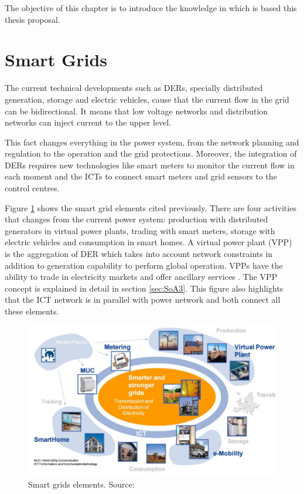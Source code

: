 \documentclass[a4paper,11pt,twoside,openright]{report}
\begin{document}
The objective of this chapter is to introduce the knowledge in which is based this thesis proposal.

\section{Smart Grids}
\label{sec:SG}
The current technical developments such as DERs, specially distributed generation, storage and electric vehicles, cause that the current flow in the grid can be bidirectional. It means that low voltage networks and distribution networks can inject current to the upper level.

This fact changes everything in the power system, from the network planning and regulation to the operation and the grid protections. Moreover, the integration of DERs requires new technologies like smart meters to monitor the current flow in each moment and the ICTs to connect smart meters and grid sensors to the control centres.

Figure \ref{fig:smart_grid_elements} shows the smart grid elements cited previously. There are four activities that changes from the current power system: production with distributed generators in virtual power plants, trading with smart meters, storage with electric vehicles and consumption in smart homes. A virtual power plant (VPP) is the aggregation of DER which takes into account network constraints in addition to generation capability to perform global operation. VPPs have the ability to trade in electricity markets and offer ancillary services \cite{VPP_definition}. The VPP concept is explained in detail in section \ref{sec:SoA3}. This figure also highlights that the ICT network is in parallel with power network and both connect all these elements.

\begin{figure}[h!]
	\centering
	\includegraphics[scale=0.5]{figures/smart_grid_elements}
	\caption{Smart grids elements. Source: \cite{EEGI2010}}
	\label{fig:smart_grid_elements}
\end{figure}
\end{document}
